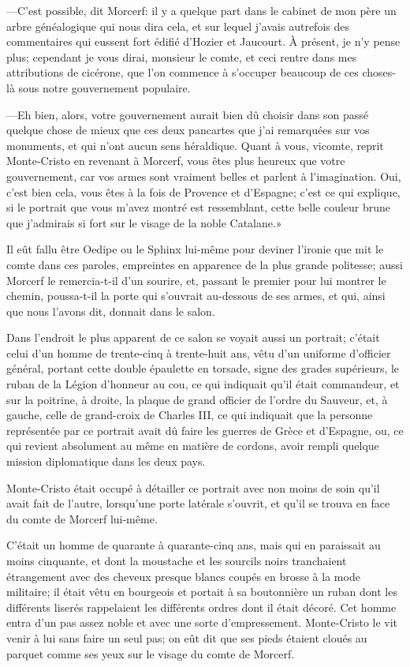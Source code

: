 —C'est possible, dit Morcerf: il y a quelque part dans le cabinet de mon père un arbre généalogique qui nous dira cela, et sur lequel j'avais autrefois des commentaires qui eussent fort édifié d'Hozier et Jaucourt. À présent, je n'y pense plus; cependant je vous dirai, monsieur le comte, et ceci rentre dans mes attributions de cicérone, que l'on commence à s'occuper beaucoup de ces choses-là sous notre gouvernement populaire. 

—Eh bien, alors, votre gouvernement aurait bien dû choisir dans son passé quelque chose de mieux que ces deux pancartes que j'ai remarquées sur vos monuments, et qui n'ont aucun sens héraldique. Quant à vous, vicomte, reprit Monte-Cristo en revenant à Morcerf, vous êtes plus heureux que votre gouvernement, car vos armes sont vraiment belles et parlent à l'imagination. Oui, c'est bien cela, vous êtes à la fois de Provence et d'Espagne; c'est ce qui explique, si le portrait que vous m'avez montré est ressemblant, cette belle couleur brune que j'admirais si fort sur le visage de la noble Catalane.» 

Il eût fallu être Oedipe ou le Sphinx lui-même pour deviner l'ironie que mit le comte dans ces paroles, empreintes en apparence de la plus grande politesse; aussi Morcerf le remercia-t-il d'un sourire, et, passant le premier pour lui montrer le chemin, poussa-t-il la porte qui s'ouvrait au-dessous de ses armes, et qui, ainsi que nous l'avons dit, donnait dans le salon. 

Dans l'endroit le plus apparent de ce salon se voyait aussi un portrait; c'était celui d'un homme de trente-cinq à trente-huit ans, vêtu d'un uniforme d'officier général, portant cette double épaulette en torsade, signe des grades supérieurs, le ruban de la Légion d'honneur au cou, ce qui indiquait qu'il était commandeur, et sur la poitrine, à droite, la plaque de grand officier de l'ordre du Sauveur, et, à gauche, celle de grand-croix de Charles III, ce qui indiquait que la personne représentée par ce portrait avait dû faire les guerres de Grèce et d'Espagne, ou, ce qui revient absolument au même en matière de cordons, avoir rempli quelque mission diplomatique dans les deux pays.  

Monte-Cristo était occupé à détailler ce portrait avec non moins de soin qu'il avait fait de l'autre, lorsqu'une porte latérale s'ouvrit, et qu'il se trouva en face du comte de Morcerf lui-même. 

C'était un homme de quarante à quarante-cinq ans, mais qui en paraissait au moins cinquante, et dont la moustache et les sourcils noirs tranchaient étrangement avec des cheveux presque blancs coupés en brosse à la mode militaire; il était vêtu en bourgeois et portait à sa boutonnière un ruban dont les différents liserés rappelaient les différents ordres dont il était décoré. Cet homme entra d'un pas assez noble et avec une sorte d'empressement. Monte-Cristo le vit venir à lui sans faire un seul pas; on eût dit que ses pieds étaient cloués au parquet comme ses yeux sur le visage du comte de Morcerf. 

